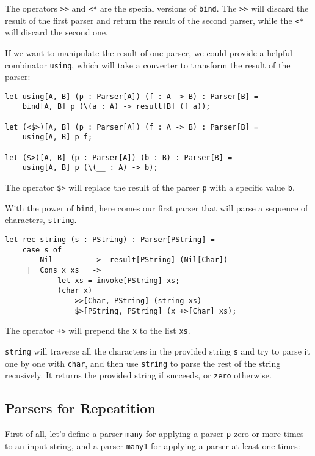 The operators \texttt{>>} and \texttt{<*} are the special versions of \texttt{bind}. The \texttt{>>} will discard the result of the first parser and return the result of the second parser, while the \texttt{<*} will discard the second one.

If we want to manipulate the result of one parser, we could provide a helpful combinator \texttt{using}, which will take a converter to transform the result of the parser:

\begin{lstlisting}
let using[A, B] (p : Parser[A]) (f : A -> B) : Parser[B] =
    bind[A, B] p (\(a : A) -> result[B] (f a));

let (<$>)[A, B] (p : Parser[A]) (f : A -> B) : Parser[B] =
    using[A, B] p f;

let ($>)[A, B] (p : Parser[A]) (b : B) : Parser[B] =
    using[A, B] p (\(__ : A) -> b);
\end{lstlisting}

The operator \texttt{\$>} will replace the result of the parser \texttt{p} with a specific value \texttt{b}.

With the power of \texttt{bind}, here comes our first parser that will parse a sequence of characters, \texttt{string}.

\begin{lstlisting}
let rec string (s : PString) : Parser[PString] =
    case s of
        Nil         ->  result[PString] (Nil[Char])
     |  Cons x xs   ->
            let xs = invoke[PString] xs;
            (char x)
                >>[Char, PString] (string xs)
                $>[PString, PString] (x +>[Char] xs);
\end{lstlisting}

The operator \texttt{+>} will prepend the \texttt{x} to the list \texttt{xs}.

\texttt{string} will traverse all the characters in the provided string \texttt{s} and try to parse it one by one with \texttt{char}, and then use \texttt{string} to parse the rest of the string recusively. It returns the provided string if succeeds, or \texttt{zero} otherwise.

\subsection{Parsers for Repeatition}

First of all, let's define a parser \texttt{many} for applying a parser \texttt{p} zero or more times to an input string, and a parser \texttt{many1} for applying a parser at least one times:

